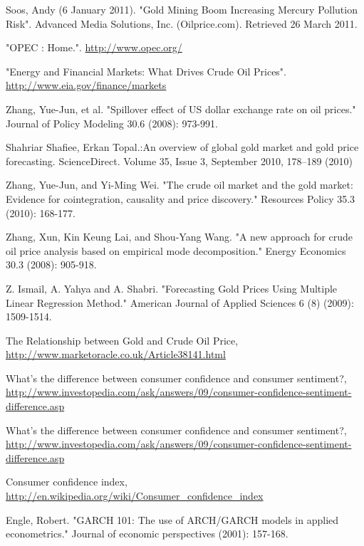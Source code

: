 \documentclass[runningheads]{llncs}
\begin{document}
\begin{thebibliography}{4}

 Soos, Andy (6 January 2011). "Gold Mining Boom Increasing Mercury Pollution Risk". Advanced Media Solutions, Inc. (Oilprice.com). Retrieved 26 March 2011.

 "OPEC : Home.". \url{http://www.opec.org/}

 "Energy and Financial Markets: What Drives Crude Oil Prices". \url{http://www.eia.gov/finance/markets}

 Zhang, Yue-Jun, et al. "Spillover effect of US dollar exchange rate on oil prices." Journal of Policy Modeling 30.6 (2008): 973-991.

 Shahriar Shafiee,  Erkan Topal.:An overview of global gold market and gold price forecasting. ScienceDirect. Volume 35, Issue 3, September 2010, 178--189 (2010)

 Zhang, Yue-Jun, and Yi-Ming Wei. "The crude oil market and the gold market: Evidence for cointegration, causality and price discovery." Resources Policy 35.3 (2010): 168-177.

Zhang, Xun, Kin Keung Lai, and Shou-Yang Wang. "A new approach for crude oil price analysis based on empirical mode decomposition." Energy Economics 30.3 (2008): 905-918.

Z. Ismail, A. Yahya and A. Shabri. "Forecasting Gold Prices Using Multiple Linear Regression Method." American Journal of Applied Sciences 6 (8) (2009): 1509-1514.

 The Relationship between Gold and Crude Oil Price, \url{http://www.marketoracle.co.uk/Article38141.html}

 What's the difference between consumer confidence and consumer sentiment?, \url{http://www.investopedia.com/ask/answers/09/consumer-confidence-sentiment-difference.asp}

 What's the difference between consumer confidence and consumer sentiment?, \url{http://www.investopedia.com/ask/answers/09/consumer-confidence-sentiment-difference.asp}

 Consumer confidence index, \url{http://en.wikipedia.org/wiki/Consumer_confidence_index}

 Engle, Robert. "GARCH 101: The use of ARCH/GARCH models in applied econometrics." Journal of economic perspectives (2001): 157-168.


\end{thebibliography}
\end{document}
